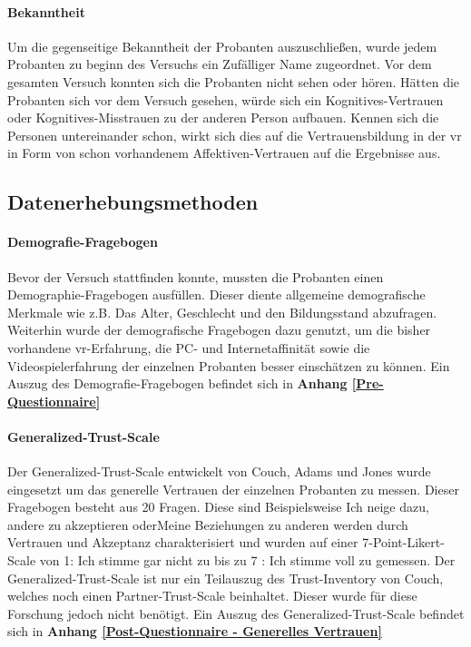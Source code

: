 \documentclass[a4paper,11pt]{article}%
\renewcommand{\\}{\vspace*{0.5\baselineskip} \newline}
\begin{document}
			\paragraph{Bekanntheit}
Um die gegenseitige Bekanntheit der Probanten auszuschließen, wurde jedem Probanten zu beginn des Versuchs ein Zufälliger Name zugeordnet. Vor dem gesamten Versuch konnten sich die Probanten nicht sehen oder hören.
Hätten die Probanten sich vor dem Versuch gesehen, würde sich ein Kognitives-Vertrauen oder Kognitives-Misstrauen zu der anderen Person aufbauen. 
Kennen sich die Personen untereinander schon, wirkt sich dies auf die Vertrauensbildung in der \ac{vr} in Form von schon vorhandenem Affektiven-Vertrauen auf die Ergebnisse aus.
			
	

	\subsection{Datenerhebungsmethoden}
			
		\paragraph{Demografie-Fragebogen}
Bevor der Versuch stattfinden konnte, mussten die Probanten einen Demographie-Fragebogen ausfüllen. Dieser diente allgemeine demografische Merkmale wie z.B. Das Alter, Geschlecht und den Bildungsstand abzufragen. Weiterhin wurde der demografische Fragebogen dazu genutzt, um die bisher vorhandene \ac{vr}-Erfahrung, die PC- und Internetaffinität sowie die Videospielerfahrung der einzelnen Probanten besser einschätzen zu können.
\\Ein Auszug des Demografie-Fragebogen befindet sich in \textbf{Anhang \ref{Pre-Questionnaire}}

		\paragraph{Generalized-Trust-Scale}
Der Generalized-Trust-Scale entwickelt von Couch, Adams und Jones \citep{couch1996assessment} wurde eingesetzt um das generelle Vertrauen der einzelnen Probanten zu messen.
Dieser Fragebogen besteht aus 20 Fragen. Diese sind Beispielsweise \dq{}Ich neige dazu, andere zu akzeptieren \dq{} oder\dq{}Meine Beziehungen zu anderen werden durch Vertrauen und Akzeptanz charakterisiert \dq{} und wurden auf einer 7-Point-Likert-Scale von \dq{}1: Ich stimme gar nicht zu\dq{} bis zu \dq{}7 : Ich stimme voll zu\dq{} gemessen. Der Generalized-Trust-Scale ist nur ein Teilauszug des \dq{}Trust-Inventory von Couch\dq{}, welches noch einen \dq{}Partner-Trust-Scale \dq{} beinhaltet. Dieser wurde für diese Forschung jedoch nicht benötigt. 
\\Ein Auszug des Generalized-Trust-Scale befindet sich in \textbf{Anhang \ref{Post-Questionnaire - Generelles Vertrauen}}
\end{document}

